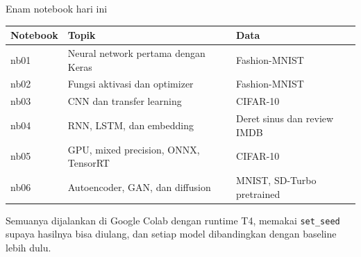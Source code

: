 \documentclass[aspectratio=169,t]{beamer}
\begin{document}
\begin{frame}{Enam notebook hari ini}
  \vspace{0.3em}
  \begin{center}
  {\footnotesize\renewcommand{\arraystretch}{1.3}
  \begin{tabular}{p{1.5cm}p{6.0cm}p{4.1cm}}
    \toprule
    \rowcolor{nvcard}\color{nvgreen}\textbf{Notebook} &
    \color{nvgreen}\textbf{Topik} &
    \color{nvgreen}\textbf{Data} \\
    \midrule
    nb01 & Neural network pertama dengan Keras & Fashion-MNIST \\
    nb02 & Fungsi aktivasi dan optimizer & Fashion-MNIST \\
    nb03 & CNN dan transfer learning & CIFAR-10 \\
    nb04 & RNN, LSTM, dan embedding & Deret sinus dan review IMDB \\
    nb05 & GPU, mixed precision, ONNX, TensorRT & CIFAR-10 \\
    nb06 & Autoencoder, GAN, dan diffusion & MNIST, SD-Turbo pretrained \\
    \bottomrule
  \end{tabular}}
  \end{center}
  \vspace{0.5em}
  {\footnotesize\color{nvgray}Semuanya dijalankan di Google Colab dengan runtime T4, memakai
  \texttt{set\_seed} supaya hasilnya bisa diulang, dan setiap model dibandingkan dengan
  baseline lebih dulu.}
\end{frame}
\end{document}
